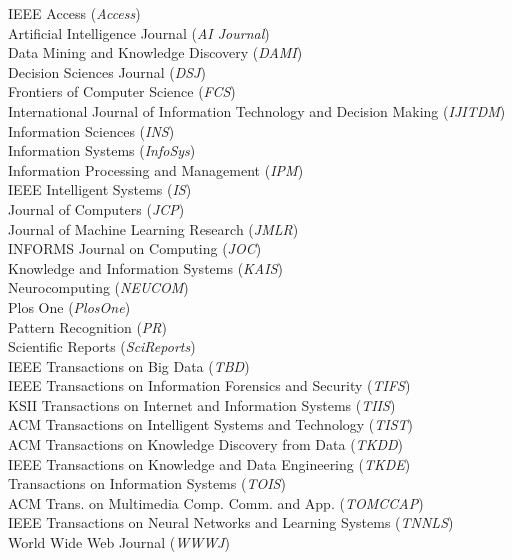 \documentclass[10pt]{article}
\newenvironment{myindentpar}[1]%
{\begin{list}{}%
         {\setlength{\leftmargin}{#1}}%
         \item[]%
}
{\end{list}}
\newcounter{list}
\begin{document}
\begin{myindentpar}{0.75cm}
{IEEE Access (\textit{Access}) \\
Artificial Intelligence Journal (\textit{AI Journal}) \\
Data Mining and Knowledge Discovery (\textit{DAMI}) \\
Decision Sciences Journal (\textit{DSJ}) \\
Frontiers of Computer Science (\textit{FCS}) \\
International Journal of Information Technology and Decision Making (\textit{IJITDM}) \\
Information Sciences (\textit{INS}) \\
Information Systems (\textit{InfoSys}) \\
Information Processing and Management (\textit{IPM}) \\
IEEE Intelligent Systems (\textit{IS}) \\
Journal of Computers (\textit{JCP}) \\
Journal of Machine Learning Research (\textit{JMLR}) \\
INFORMS Journal on Computing (\textit{JOC}) \\
Knowledge and Information Systems (\textit{KAIS}) \\
Neurocomputing (\textit{NEUCOM}) \\
Plos One (\textit{PlosOne}) \\
Pattern Recognition (\textit{PR}) \\
Scientific Reports (\textit{SciReports}) \\
IEEE Transactions on Big Data (\textit{TBD}) \\
IEEE Transactions on Information Forensics and Security (\textit{TIFS}) \\
KSII Transactions on Internet and Information Systems (\textit{TIIS}) \\
ACM Transactions on Intelligent Systems and Technology (\textit{TIST}) \\
ACM Transactions on Knowledge Discovery from Data (\textit{TKDD}) \\
IEEE Transactions on Knowledge and Data Engineering (\textit{TKDE}) \\
Transactions on Information Systems (\textit{TOIS}) \\
ACM Trans. on Multimedia Comp. Comm. and App. (\textit{TOMCCAP}) \\
IEEE Transactions on Neural Networks and Learning Systems (\textit{TNNLS}) \\
World Wide Web Journal (\textit{WWWJ})

}


\end{myindentpar}
\end{document}
